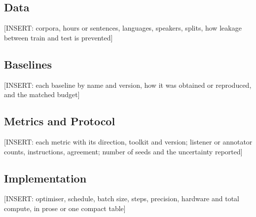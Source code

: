 \subsection{Data}
[INSERT: corpora, hours or sentences, languages, speakers, splits, how leakage between train and test is prevented]

\subsection{Baselines}
[INSERT: each baseline by name and version, how it was obtained or reproduced, and the matched budget]

\subsection{Metrics and Protocol}
[INSERT: each metric with its direction, toolkit and version; listener or annotator counts, instructions, agreement; number of seeds and the uncertainty reported]

\subsection{Implementation}
[INSERT: optimiser, schedule, batch size, steps, precision, hardware and total compute, in prose or one compact table]
